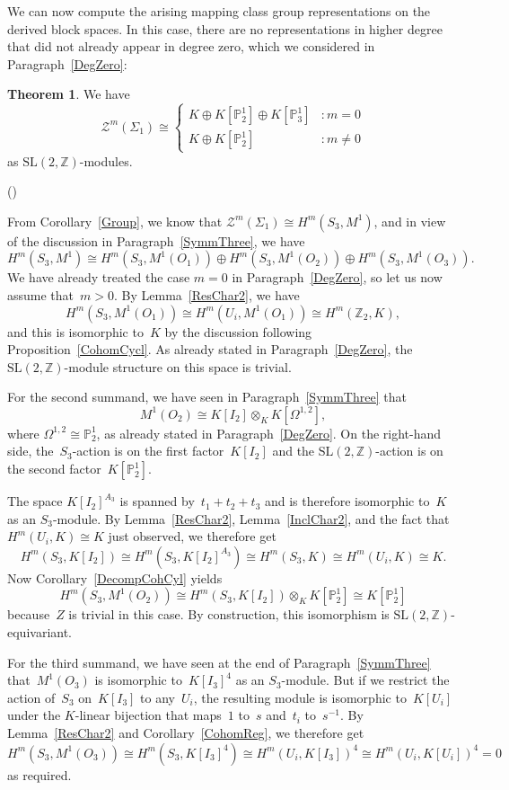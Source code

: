 \documentclass[12pt]{article}
\makeatletter
\newcounter{num}
\newenvironment{pflist}{\begin{list}{(\arabic{num})}{\usecounter{num} \leftmargin0cm \itemindent5pt}}{\end{list}}
\theoremstyle{definition}
\newtheorem{Theorem}[Satz]{Theorem}
\theoremstyle{break}
\renewenvironment{proof}[1][\proofname]{\par
\vspace{-5pt}%
\pushQED{\qed}%
\normalfont
\topsep0pt \partopsep0pt %
\trivlist
\item[\hskip\labelsep
\bfseries
#1\@addpunct{.}]\ignorespaces
}{%
\popQED\endtrivlist\@endpefalse
\addvspace{6pt plus 6pt} %
}
\newcommand{\Z}{\mathbb{Z}}
\newcommand{\SL}{\mathrm{SL}}
\renewcommand{\P}{\mathbb{P}}
\renewcommand{\1}{\mathbbm{1}}
\newcommand{\TFT}{\mathcal{Z}}
\renewcommand{\P}{\mathbb{P}}
\makeatother
\begin{document}
We can now compute the arising mapping class group representations on the derived block spaces. In this case, there are no representations in higher degree that did not already appear in degree zero, which we considered in Paragraph~\ref{DegZero}:
\begin{Theorem} \label{ModGroupChar2}
We have
\[\TFT^m(\Sigma_{1}) \cong
\begin{cases}
K \oplus K[\P^1_2] \oplus K[\P^1_3] &: m = 0\\
K \oplus K[\P^1_2] &: m \neq 0
\end{cases}\]
as $\SL(2,\Z)$-modules.
\end{Theorem}
\begin{proof}
\begin{pflist}
\item
From Corollary~\ref{Group}, we know that $\TFT^m(\Sigma_{1}) \cong H^m(S_3, M^1)$, and in view of the discussion in Paragraph~\ref{SymmThree}, we have
\[H^m(S_3, M^1) \cong H^m(S_3, M^1(O_1)) \oplus H^m(S_3, M^1(O_2))
\oplus H^m(S_3, M^1(O_3)).\]
We have already treated the case $m=0$ in Paragraph~\ref{DegZero}, so let us now assume that~\mbox{$m>0$}. By Lemma~\ref{ResChar2}, we have
\[H^m(S_3, M^1(O_1)) \cong H^m(U_i, M^1(O_1)) \cong H^m(\Z_2, K),\]
and this is isomorphic to~$K$ by the discussion following Proposition~\ref{CohomCycl}. As already stated in Paragraph~\ref{DegZero}, the $\SL(2,\Z)$-module structure on this space is trivial.

\item
For the second summand, we have seen in Paragraph~\ref{SymmThree} that
\[M^1(O_2) \cong K[I_2] \otimes_{K} K[\Omega^{1,2}],\]
where $\Omega^{1,2} \cong \P^1_2$, as already stated in Paragraph~\ref{DegZero}. On the right-hand side, the~$S_3$-action is on the first factor~$K[I_2]$ and the $\SL(2,\Z)$-action is on the second factor~$K[\P^1_2]$.

The space $K[I_2]^{A_3}$ is spanned by~$t_1 + t_2 + t_3$ and is therefore isomorphic to~$K$ as an $S_3$-module. By Lemma~\ref{ResChar2}, Lemma~\ref{InclChar2}, and the fact that $H^m(U_i, K) \cong K$ just observed, we therefore get
\[H^m(S_3, K[I_2]) \cong H^m(S_3, K[I_2]^{A_3}) \cong H^m(S_3, K)
\cong H^m(U_i, K) \cong K.\]
Now Corollary~\ref{DecompCohCyl} yields
\[H^m(S_3, M^1(O_2)) \cong H^m(S_3, K[I_2]) \otimes_{K} K[\P^1_2] \cong K[\P^1_2]\]
because~$Z$ is trivial in this case.
By construction, this isomorphism is $\SL(2, \Z)$-equi\-variant.

\item
For the third summand, we have seen at the end of Paragraph~\ref{SymmThree} that~$M^1(O_3)$ is isomorphic to~$K[I_3]^4$ as an $S_3$-module. But if we restrict the action of~$S_3$ on~$K[I_3]$ to any~$U_i$, the resulting module is isomorphic to~$K[U_i]$ under the $K$-linear bijection that maps~$1$ to~$s$ and~$t_i$ to~$s^{-1}$. By Lemma~\ref{ResChar2} and Corollary~\ref{CohomReg}, we therefore get
\[H^m(S_3, M^1(O_3)) \cong H^m(S_3, K[I_3]^4) \cong H^m(U_i, K[I_3])^4
\cong H^m(U_i, K[U_i])^4 = 0\]
as required.
\qedhere
\end{pflist}
\end{proof}
\end{document}
